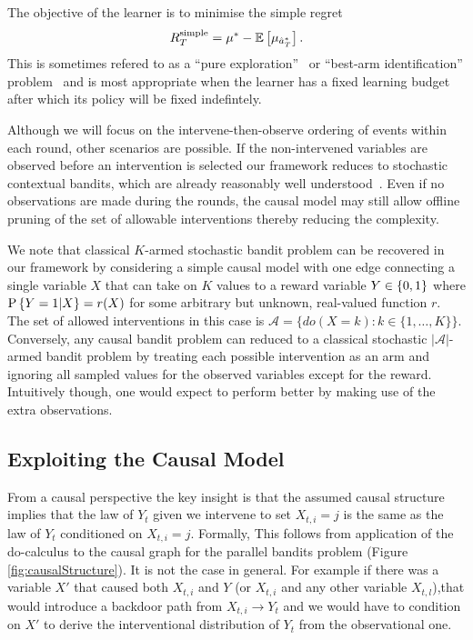 The objective of the learner is to minimise the simple regret
\begin{equation}
\label{eq:regret-simple}
	\simpleregret = \mu^* - \E{\mu_{\hat a^*_T}}.
\end{equation}
This is sometimes refered to as a ``pure exploration''~\citep{Bubeck2009} or ``best-arm identification'' problem~\citep{Gabillon2012} and
is most appropriate when the learner has a fixed learning budget after which its policy will be fixed indefintely. 

Although we will focus on the intervene-then-observe ordering of events within each round, other scenarios are possible. 
If the non-intervened variables are observed before an intervention is selected our framework 
reduces to stochastic contextual bandits, which are already reasonably well understood~\citep{Agarwal2014}. 
Even if no observations are made during the rounds, the causal model may still allow offline pruning of the set of 
allowable interventions thereby reducing the complexity.


We note that classical $K$-armed stochastic bandit problem can be recovered in our framework by considering a simple causal model with one 
edge connecting a single variable $X$ that can take on $K$ values to a reward variable $Y \in \set{0,1}$ where $\P{Y = 1|X} = r(X)$ for some 
arbitrary but unknown, real-valued function $r$. The set of allowed interventions in this case is $\mathcal{A} = \{ do(X = k) \colon k \in \{1, \ldots, K\}\}$.
Conversely, any causal bandit problem can reduced to a classical stochastic $|\mathcal{A}|$-armed bandit problem by 
treating each possible intervention as an arm and ignoring all sampled values for the observed variables except for the reward.
Intuitively though, one would expect to perform better by making use of the extra observations.



\iffalse
\subsection{Exploiting the Causal Model}

From a causal perspective the key insight is that the assumed causal structure implies that
the law of $Y_t$ given we intervene to set $X_{t,i} = j$ is the same as the law of $Y_t$ conditioned
on $X_{t,i} = j$. Formally,
This follows from application of the do-calculus \cite{Pearl2000} to the causal graph for the parallel bandits problem (Figure \ref{fig:causalStructure}). It is not the case in general. 
For example if there was a variable $X'$ that caused both $X_{t,i}$ and $Y$ (or $X_{t,i}$ and any other variable $X_{t,l}$),that would introduce a backdoor path from $X_{t,i} \rightarrow Y_t$ and we would have to condition on $X'$ to derive the interventional distribution of $Y_t$ from the observational one.


